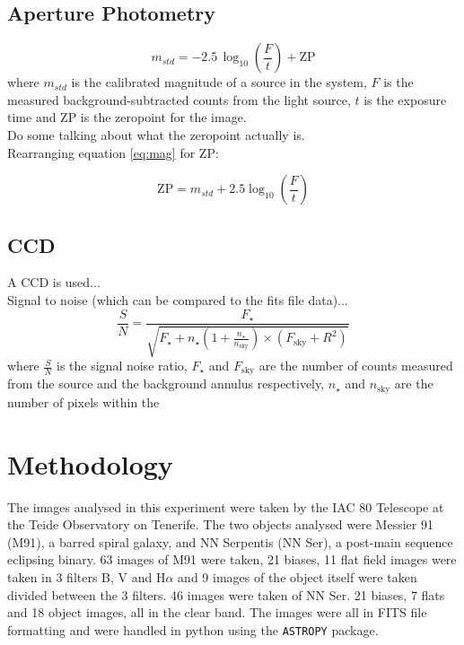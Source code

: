 \documentclass[%
reprint,
amsmath,amssymb,
aps,
]{revtex4-2}
\begin{document}
		\subsection{Aperture Photometry}
		
			\begin{equation}
				m_{std} = -2.5 \, \log_{10}\left(\frac{F}{t}\right) + \text{ZP}
				\label{eq:mag}
			\end{equation} where $m_{std}$ is the calibrated magnitude of a source in the system, $F$ is the measured background-subtracted counts from the light source, $t$ is the exposure time and $\text{ZP}$ is the zeropoint for the image.\\
		
			Do some talking about what the zeropoint actually is.\\
			
			Rearranging equation \ref{eq:mag} for $\text{ZP}$:
			
			\begin{equation}
				\text{ZP} = m_{std} + 2.5 \log_{10}\left(\frac{F}{t}\right)
				\label{eq:zeropoint}
			\end{equation}
		
		\subsection{CCD}
		
			A CCD is used...\\
			
			Signal to noise (which can be compared to the fits file data)...\\
			
			\begin{equation}
				\frac{S}{N} = \frac{F_\star}{\sqrt{F_\star + n_\star \left( 1 + \frac{n_\star}{n_\text{sky}}\right) \times \left(F_\text{sky} + R^2\right)}}
			\end{equation}where $\frac{S}{N}$ is the signal noise ratio, $F_\star$ and $F_\text{sky}$ are the number of counts measured from the source and the background annulus respectively, $n_\star$ and $n_\text{sky}$ are the number of pixels within the  
	 
	\section{Methodology}
	
		The images analysed in this experiment were taken by the IAC 80 Telescope at the Teide Observatory on Tenerife. The two objects analysed were Messier 91 (M91), a barred spiral galaxy\cite{messier}, and NN Serpentis (NN Ser), a post-main sequence eclipsing binary\cite{Horner_2012}. 63 images of M91 were taken, 21 biases, 11 flat field images were taken in 3 filters B, V and H$\alpha$ and 9 images of the object itself were taken divided between the 3 filters. 46 images were taken of NN Ser. 21 biases, 7 flats and 18 object images, all in the clear band. The images were all in FITS file formatting and were handled in python using the \texttt{ASTROPY} package.
	
\end{document}

